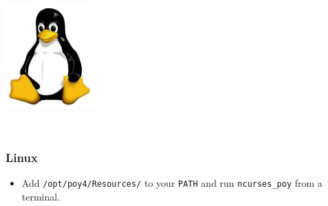 {\begin{flushleft}
	\begin{minipage}[c]{0.074\textwidth}
   		\includegraphics[width=\textwidth]{doc/figures/figlogolinux.jpg}
	\end{minipage}
	\,
	\begin{minipage}[t]{0.88\textwidth}
	   	\subsubsection*{Linux}
	\end{minipage}
	\begin{itemize}
    		\item Add \texttt{/opt/poy4/Resources/} to your \texttt{PATH} and run
    \texttt{ncurses\_poy} from a terminal.
    	\end{itemize}
\end{flushleft}

}
